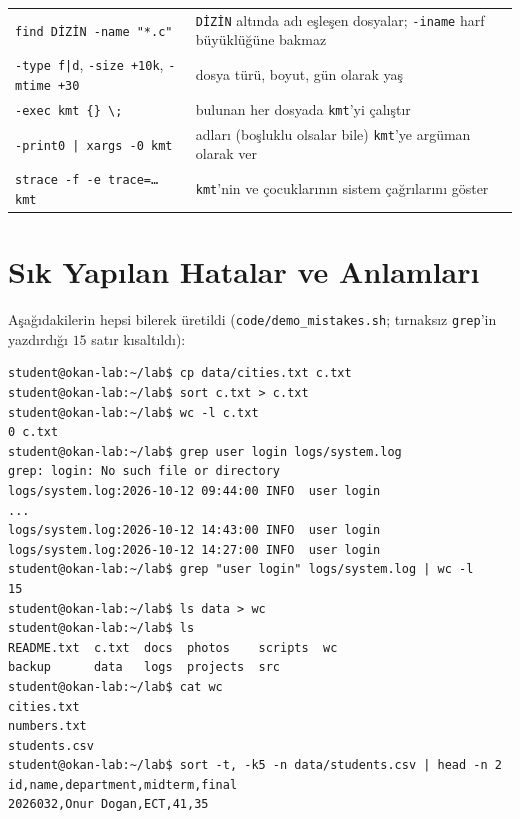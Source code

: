 \documentclass[11pt,a4paper]{article}
\newcommand{\cmd}[1]{\texttt{#1}}
\begin{document}
{\begin{longtable}{@{}p{4.6cm}p{10.9cm}@{}}
\midrule
\cmd{find DİZİN -name "*.c"} & \texttt{DİZİN} altında adı eşleşen dosyalar; \cmd{-iname} harf büyüklüğüne bakmaz\\
\quad \cmd{-type f|d}, \cmd{-size +10k}, \cmd{-mtime +30} & dosya türü, boyut, gün olarak yaş\\
\quad \cmd{-exec kmt \{\} \textbackslash;} & bulunan her dosyada \texttt{kmt}'yi çalıştır\\
\quad \cmd{-print0 | xargs -0 kmt} & adları (boşluklu olsalar bile) \texttt{kmt}'ye argüman olarak ver\\
\cmd{strace -f -e trace=\dots{} kmt} & \texttt{kmt}'nin ve çocuklarının sistem çağrılarını göster\\
\bottomrule
\end{longtable}
}

\section{Sık Yapılan Hatalar ve Anlamları}
\label{sec:errors}

Aşağıdakilerin hepsi bilerek üretildi (\cmd{code/demo\_mistakes.sh}; tırnaksız \cmd{grep}'in yazdırdığı $15$ satır kısaltıldı):

\begin{lstlisting}[style=term]
student@okan-lab:~/lab$ cp data/cities.txt c.txt
student@okan-lab:~/lab$ sort c.txt > c.txt
student@okan-lab:~/lab$ wc -l c.txt
0 c.txt
student@okan-lab:~/lab$ grep user login logs/system.log
grep: login: No such file or directory
logs/system.log:2026-10-12 09:44:00 INFO  user login
...
logs/system.log:2026-10-12 14:43:00 INFO  user login
logs/system.log:2026-10-12 14:27:00 INFO  user login
student@okan-lab:~/lab$ grep "user login" logs/system.log | wc -l
15
student@okan-lab:~/lab$ ls data > wc
student@okan-lab:~/lab$ ls
README.txt  c.txt  docs  photos    scripts  wc
backup      data   logs  projects  src
student@okan-lab:~/lab$ cat wc
cities.txt
numbers.txt
students.csv
student@okan-lab:~/lab$ sort -t, -k5 -n data/students.csv | head -n 2
id,name,department,midterm,final
2026032,Onur Dogan,ECT,41,35
\end{lstlisting}
\end{document}

